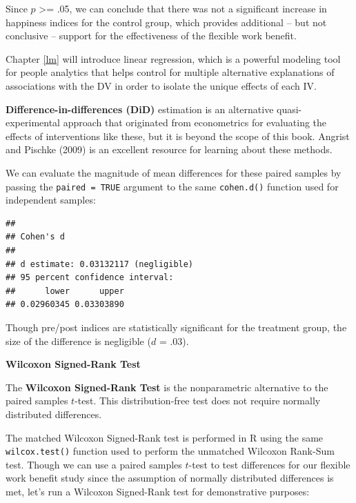 \documentclass[
]{book}
\newenvironment{Shaded}{\begin{snugshade}}{\end{snugshade}}
\newcommand{\AttributeTok}[1]{\textcolor[rgb]{0.77,0.63,0.00}{#1}}
\newcommand{\CommentTok}[1]{\textcolor[rgb]{0.56,0.35,0.01}{\textit{#1}}}
\newcommand{\ConstantTok}[1]{\textcolor[rgb]{0.00,0.00,0.00}{#1}}
\newcommand{\FunctionTok}[1]{\textcolor[rgb]{0.00,0.00,0.00}{#1}}
\newcommand{\NormalTok}[1]{#1}
\newcommand{\SpecialCharTok}[1]{\textcolor[rgb]{0.00,0.00,0.00}{#1}}
\begin{document}
Since \(p\) \textgreater= .05, we can conclude that there was not a significant increase in happiness indices for the control group, which provides additional -- but not conclusive -- support for the effectiveness of the flexible work benefit.

Chapter \ref{lm} will introduce linear regression, which is a powerful modeling tool for people analytics that helps control for multiple alternative explanations of associations with the DV in order to isolate the unique effects of each IV.

\textbf{Difference-in-differences (DiD)} estimation is an alternative quasi-experimental approach that originated from econometrics for evaluating the effects of interventions like these, but it is beyond the scope of this book. Angrist and Pischke (2009) is an excellent resource for learning about these methods.

We can evaluate the magnitude of mean differences for these paired samples by passing the \texttt{paired\ =\ TRUE} argument to the same \texttt{cohen.d()} function used for independent samples:

\begin{Shaded}
\end{Shaded}

\begin{verbatim}
## 
## Cohen's d
## 
## d estimate: 0.03132117 (negligible)
## 95 percent confidence interval:
##      lower      upper 
## 0.02960345 0.03303890
\end{verbatim}

Though pre/post indices are statistically significant for the treatment group, the size of the difference is negligible (\(d\) = .03).

\textbf{Wilcoxon Signed-Rank Test}

The \textbf{Wilcoxon Signed-Rank Test} is the nonparametric alternative to the paired samples \(t\)-test. This distribution-free test does not require normally distributed differences.

The matched Wilcoxon Signed-Rank test is performed in R using the same \texttt{wilcox.test()} function used to perform the unmatched Wilcoxon Rank-Sum test. Though we can use a paired samples \(t\)-test to test differences for our flexible work benefit study since the assumption of normally distributed differences is met, let's run a Wilcoxon Signed-Rank test for demonstrative purposes:
\end{document}
